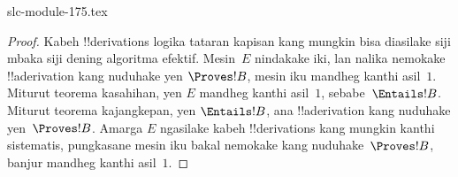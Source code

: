 \begin{filecontents*}[overwrite]{slc-module-175.tex}
\begin{proof}
  Kabeh !!{derivation}s logika tataran kapisan kang mungkin
  bisa diasilake siji mbaka siji dening algoritma efektif.
  Mesin~$E$ nindakake iki, lan nalika nemokake
  !!a{derivation} kang nuduhake yen $\Proves
  !B$, mesin iku mandheg kanthi asil~$1$.
  Miturut teorema kasahihan, yen $E$ mandheg kanthi
  asil~$1$, sebabe~$\Entails !B$. Miturut teorema
  kajangkepan, yen $\Entails !B$, ana !!a{derivation}
  kang nuduhake yen~$\Proves !B$. Amarga $E$
  ngasilake kabeh !!{derivation}s kang mungkin
  kanthi sistematis, pungkasane mesin iku bakal
  nemokake kang nuduhake~$\Proves !B$,
  banjur mandheg kanthi asil~$1$.
\end{proof}


\end{filecontents*}

